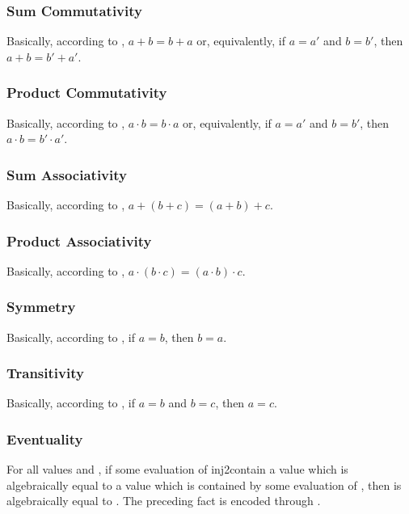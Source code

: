 \documentclass{report}
\begin{document}
\subsubsection{Sum Commutativity}
Basically, according to , \(a + b = b + a\) or, equivalently, if \(a = a'\) and \(b = b'\), then \(a + b = b' + a'\).

\subsubsection{Product Commutativity}
Basically, according to , \(a \cdot b = b \cdot a\) or, equivalently, if \(a = a'\) and \(b = b'\), then \(a \cdot b = b' \cdot a'\).

\subsubsection{Sum Associativity}
Basically, according to , \(a + \left(b + c\right) = \left(a + b\right) + c\).

\subsubsection{Product Associativity}
Basically, according to , \(a \cdot \left(b \cdot c\right) = \left(a \cdot b\right) \cdot c\).

\subsubsection{Symmetry}
Basically, according to , if \(a = b\), then \(b = a\).

\subsubsection{Transitivity}
Basically, according to , if \(a = b\) and \(b = c\), then \(a = c\).

\subsubsection{Eventuality}
For all  values  and , if some evaluation of  \gls{inj2contain} a value which is algebraically equal to a value which is contained by some evaluation of , then  is algebraically equal to .  The preceding fact is encoded through .
\end{document}
